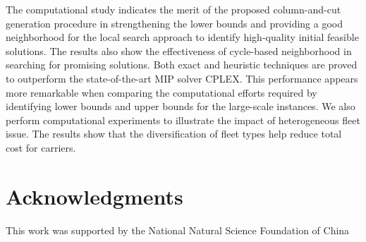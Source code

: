\documentclass[11pt,nonblindrev,fleqn]{article}
\begin{document}
The computational study indicates the merit of the proposed column-and-cut generation procedure in strengthening the lower bounds and providing a good neighborhood for the local search approach to identify high-quality initial feasible solutions. The results also show the effectiveness of cycle-based neighborhood in searching for promising solutions. Both exact and heuristic techniques are proved to outperform the state-of-the-art MIP solver CPLEX. This performance appears more remarkable when comparing the computational efforts required by identifying lower bounds and upper bounds for the large-scale instances. We also perform computational experiments to illustrate the impact of heterogeneous fleet issue. The results show that the diversification of fleet types help reduce total cost for carriers.
\section*{Acknowledgments}

This work was supported by the National Natural Science Foundation of China
\end{document}
